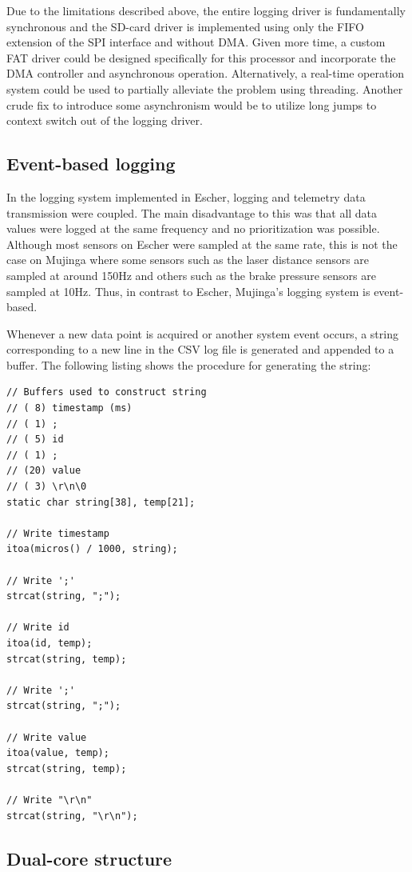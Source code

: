 Due to the limitations described above, the entire logging driver is fundamentally synchronous and the SD-card driver is implemented using only the FIFO extension of the SPI interface and without DMA. Given more time, a custom FAT driver could be designed specifically for this processor and incorporate the DMA controller and asynchronous operation. Alternatively, a real-time operation system could be used to partially alleviate the problem using threading. Another crude fix to introduce some asynchronism would be to utilize long jumps to context switch out of the logging driver.

\subsection{Event-based logging}

In the logging system implemented in Escher, logging and telemetry data transmission were coupled. The main disadvantage to this was that all data values were logged at the same frequency and no prioritization was possible. Although most sensors on Escher were sampled at the same rate, this is not the case on Mujinga where some sensors such as the laser distance sensors are sampled at around 150Hz and others such as the brake pressure sensors are sampled at 10Hz. Thus, in contrast to Escher, Mujinga's logging system is event-based.

Whenever a new data point is acquired or another system event occurs, a string corresponding to a new line in the CSV log file is generated and appended to a buffer. The following listing shows the procedure for generating the string:

\begin{verbatim}
// Buffers used to construct string
// ( 8) timestamp (ms)
// ( 1) ;
// ( 5) id
// ( 1) ;
// (20) value
// ( 3) \r\n\0
static char string[38], temp[21];

// Write timestamp
itoa(micros() / 1000, string);

// Write ';'
strcat(string, ";");

// Write id
itoa(id, temp);
strcat(string, temp);

// Write ';'
strcat(string, ";");

// Write value
itoa(value, temp);
strcat(string, temp);

// Write "\r\n"
strcat(string, "\r\n");
\end{verbatim}

\subsection{Dual-core structure}

